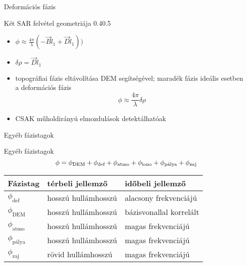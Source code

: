 \def\ft{Deformációs fázis}

\begin{frame}{\ft}
    \begin{figp}{}{Két SAR felvétel geometriája \cite{BurgmannInSAR}}{0.4}{0.5}
        \begin{itemize}
            \item $\phi \approx \frac{4\pi}{\lambda} (- \vec{B}\hat{l}_1 + \vec{D}\hat{l}_1))$
            \item $\delta\rho = \vec{D}\hat{l}_1$
            \item topográfiai fázis eltávolítása DEM segítségével; maradék fázis ideális esetben a deformációs fázis $$\phi \approx \frac{4\pi}{\lambda}\delta\rho$$
            \item CSAK műholdirányú elmozdulások detektálhatóak
        \end{itemize}
    \end{figp}
\end{frame}


\def\ft{Egyéb fázistagok}

\begin{frame}{\ft}
    \begin{minic}{0.75}
    \end{minic}
\end{frame}

\begin{frame}{\ft}
    $$ \phi = \phi_{\text{DEM}} + \phi_{\text{def}} + \phi_{\text{atmo}} + \phi_{\text{iono}} + \phi_{\text{pálya}} + \phi_{\text{zaj}} $$
    \begin{table}[H]
        \centering
        \begin{tabular}{l l l} \toprule
            Fázistag & térbeli jellemző & időbeli jellemző\\ \midrule
            $\phi_{\text{def}}$ & hosszú hullámhosszú & alacsony frekvenciájú\\
            $\phi_{\text{DEM}}$ & hosszú hullámhosszú & bázisvonallal korrelált \\
            $\phi_{\text{atmo}}$ & hosszú hullámhosszú & magas frekvenciájú\\
            $\phi_{\text{pálya}}$ & hosszú hullámhosszú & magas frekvenciájú \\
            $\phi_{\text{zaj}}$ & rövid hullámhosszú & magas frekvenciájú \\ \bottomrule
        \end{tabular}
    \end{table}
    \centering
    
    \cite{Hooper2012}
\end{frame}
